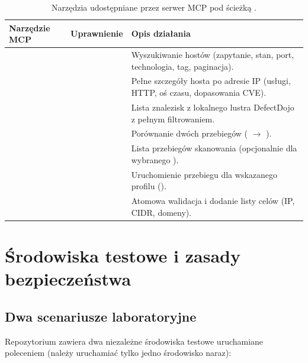 \documentclass[10pt,a4paper]{article}
\begin{document}
\begin{table}[htbp]
  \centering
  \footnotesize
  \begin{tabularx}{\linewidth}{@{}L{28mm}L{24mm}Y@{}}
    \toprule
    \textbf{Narzędzie MCP} & \textbf{Uprawnienie} & \textbf{Opis działania} \\
    \midrule
     &  & Wyszukiwanie hostów (zapytanie, stan, port, technologia, tag, paginacja). \\
     &  & Pełne szczegóły hosta po adresie IP (usługi, HTTP, oś czasu, dopasowania CVE). \\
     &  & Lista znalezisk z lokalnego lustra DefectDojo z pełnym filtrowaniem. \\
     &  & Porównanie dwóch przebiegów ( $\rightarrow$ ). \\
     &  & Lista przebiegów skanowania (opcjonalnie dla wybranego ). \\
     &  & Uruchomienie przebiegu dla wskazanego profilu (). \\
     &  & Atomowa walidacja i dodanie listy celów (IP, CIDR, domeny). \\
    \bottomrule
  \end{tabularx}
  \caption{Narzędzia udostępniane przez serwer MCP pod ścieżką .}
  \label{tab:mcp}
\end{table}

\section{Środowiska testowe i zasady bezpieczeństwa}

\subsection{Dwa scenariusze laboratoryjne}

Repozytorium zawiera dwa niezależne środowiska testowe uruchamiane poleceniem  (należy uruchamiać tylko jedno środowisko naraz):
\end{document}

